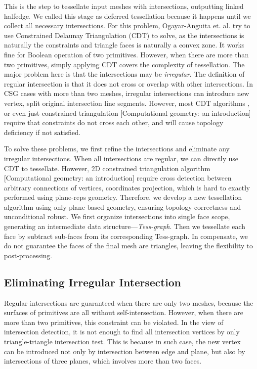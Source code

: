 \documentclass[10pt,journal,compsoc]{IEEEtran}
\begin{document}
\label{sec:tessellation}
This is the step to tessellate input meshes with intersections, outputting linked halfedge. We called this stage as deferred tessellation because it happens until we collect all necessary intersections. For this problem, Ogayar-Anguita et. al. \cite{ogayar2015deferred} try to use Constrained Delaunay Triangulation (CDT) to solve, as the intersections is naturally the constraints and triangle faces is naturally a convex zone. It works fine for Boolean operation of two primitives. However, when there are more than two primitives, simply applying CDT covers the complexity of tessellation. The major problem here is that the intersections may be \emph{irregular}. The definition of regular intersection is that it does not cross or overlap with other intersections. In CSG cases with more than two meshes, irregular intersections can introduce new vertex, split original intersection line segments. However, most CDT algorithms \cite{chew1989constrained}, or even just constrained triangulation [Computational geometry: an introduction] require that constraints do not cross each other, and will cause topology deficiency if not satisfied.

To solve these problems, we first refine the intersections and eliminate any irregular intersections. When all intersections are regular, we can directly use CDT to tessellate. However, 2D constrained triangulation algorithm \cite{chew1989constrained} [Computational geometry: an introduction] require cross detection between arbitrary connections of vertices, coordinates projection, which is hard to exactly performed using plane-reps geometry. Therefore, we develop a new tessellation algorithm using only plane-based geometry, ensuring topology correctness and unconditional robust. We first organize intersections into single face scope, generating an intermediate data structure---\emph{Tess-graph}. Then we tessellate each face by subtract sub-faces from its corresponding Tess-graph. In compensate, we do not guarantee the faces of the final mesh are triangles, leaving the flexibility to post-processing.

\subsection{Eliminating Irregular Intersection}

Regular intersections are guaranteed when there are only two meshes, because the surfaces of primitives are all without self-intersection. However, when there are more than two primitives, this constraint can be violated. In the view of intersection detection, it is not enough to find all intersection vertices by only triangle-triangle intersection test. This is because in such case, the new vertex can be introduced not only by intersection between edge and plane, but also by intersections of three planes, which involves more than two faces.
\end{document}
